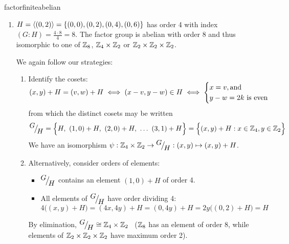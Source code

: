 \begin{examples}{}{factorfiniteabelian}
\begin{enumerate}
		 
  \item $H=\left\langle (0,2)\right\rangle=\{(0,0),(0,2),(0,4),(0,6)\}$ has order 4 with index $(G:H)=\frac{4\cdot 8}4=8$. The factor group is abelian with order 8 and thus isomorphic to one of $\mathbb{Z}_8$, $\mathbb{Z}_4\times\mathbb{Z}_2$ or $\mathbb{Z}_2\times\mathbb{Z}_2\times\mathbb{Z}_2$.\par
	We again follow our strategies:
	\begin{enumerate}
	  \item Identify the cosets:
		\[(x,y)+H=(v,w)+H\iff (x-v,y-w)\in H\iff \smash[t]{\begin{cases}
		x=v,\text{and}\\
		y-w=2k\text{ is even}
		\end{cases}}\]
		from which the distinct cosets may be written
		\[\quotient GH=\Bigl\{H,\ (1,0)+H,\ (2,0)+H,\ \ldots\ (3,1)+H\Bigr\} =\Bigl\{(x,y)+H:x\in\Z_4,y\in\Z_2\Bigr\}\]
		We have an isomorphism $\psi:\mathbb{Z}_4\times\mathbb{Z}_2\to\smash[t]{{}^{\textstyle {G}}\!\big/_{\textstyle \!{H}}}:(x,y)\mapsto (x,y)+H$.
		\item Alternatively, consider orders of elements:
		\begin{itemize}
  		\item ${}^{\textstyle {G}}\!\big/_{\textstyle \!{H}}$ contains an element $(1,0)+H$ of order 4.
  		\item All elements of ${}^{\textstyle {G}}\!\big/_{\textstyle \!{H}}$ have order dividing 4:
  		\[4\bigl((x,y)+H\bigr)=(4x,4y)+H=(0,4y)+H=2y\bigl((0,2)+H\bigr)=H\]
		\end{itemize}
		By elimination, ${}^{\textstyle {G}}\!\big/_{\textstyle \!{H}}\cong\mathbb{Z}_4\times\mathbb{Z}_2$ \ ($\mathbb{Z}_8$ has an element of order 8, while elements of $\mathbb{Z}_2\times\mathbb{Z}_2\times\mathbb{Z}_2$ have maximum order 2).
  \end{enumerate}
% 


\end{enumerate}
\end{examples}
